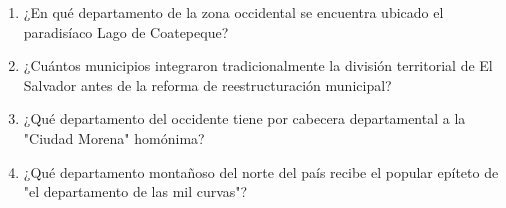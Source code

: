 \documentclass[10pt,a4paper]{article}
\begin{document}
\begin{enumerate}[label=\textbf{\arabic*.}]
\item ¿En qué departamento de la zona occidental se encuentra ubicado el paradisíaco Lago de Coatepeque?
\begin{enumerate}[label=\textbf{\Alph*)}]
\end{enumerate}
\vspace{0.15cm}
\item ¿Cuántos municipios integraron tradicionalmente la división territorial de El Salvador antes de la reforma de reestructuración municipal?
\begin{enumerate}[label=\textbf{\Alph*)}]
\end{enumerate}
\vspace{0.15cm}
\item ¿Qué departamento del occidente tiene por cabecera departamental a la "Ciudad Morena" homónima?
\begin{enumerate}[label=\textbf{\Alph*)}]
\end{enumerate}
\vspace{0.15cm}
\item ¿Qué departamento montañoso del norte del país recibe el popular epíteto de "el departamento de las mil curvas"?
\begin{enumerate}[label=\textbf{\Alph*)}]
\end{enumerate}
\end{enumerate}
\end{document}
